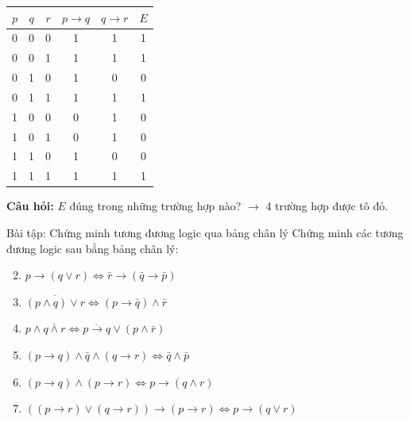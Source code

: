 \documentclass[12pt,a4paper]{article}
\begin{document}
\begin{center}
\renewcommand{\arraystretch}{1.2}
\begin{tabular}{|c|c|c|c|c|c|}
\hline
$p$ & $q$ & $r$ & $p \to q$ & $q \to r$ & $E$ \\ \hline
0 & 0 & 0 & 1 & 1 & \textcolor{AccentRed}{1} \\ \hline
0 & 0 & 1 & 1 & 1 & \textcolor{AccentRed}{1} \\ \hline
0 & 1 & 0 & 1 & 0 & 0 \\ \hline
0 & 1 & 1 & 1 & 1 & \textcolor{AccentRed}{1} \\ \hline
1 & 0 & 0 & 0 & 1 & 0 \\ \hline
1 & 0 & 1 & 0 & 1 & 0 \\ \hline
1 & 1 & 0 & 1 & 0 & 0 \\ \hline
1 & 1 & 1 & 1 & 1 & \textcolor{AccentRed}{1} \\ \hline
\end{tabular}
\end{center}

\textbf{Câu hỏi:} $E$ đúng trong những trường hợp nào? $\rightarrow$ 4 trường hợp được tô đỏ.

\begin{baitap}{Bài tập: Chứng minh tương đương logic qua bảng chân lý}
Chứng minh các tương đương logic sau bằng bảng chân lý:
\begin{enumerate}[label=\textbf{\alph*)}]
  \setcounter{enumi}{1}
  \item $p \to (q \lor r) \Leftrightarrow \bar{r} \to (\bar{q} \to \bar{p})$
  \item $\overline{(p \land q) \lor r} \Leftrightarrow (p \to \bar{q}) \land \bar{r}$
  \item $p \land \overline{q \land r} \Leftrightarrow \overline{p \to q} \lor (p \land \bar{r})$
  \item $(p \to q) \land \bar{q} \land (q \to r) \Leftrightarrow \bar{q} \land \bar{p}$
  \item $(p \to q) \land (p \to r) \Leftrightarrow p \to (q \land r)$
  \item $((p \to r) \lor (q \to r)) \to (p \to r) \Leftrightarrow p \to (q \lor r)$
\end{enumerate}
\end{baitap}
\end{document}
